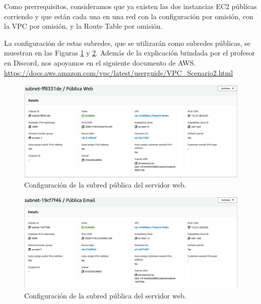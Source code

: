 \documentclass{article}
\begin{document}
Como prerrequisitos, consideramos que ya existen las
dos instancias EC2 p\'ublicas corriendo y que est\'an
cada una en una red con la configuraci\'on por omisi\'on,
con la VPC por omisi\'on, y la Route Table por omisi\'on.

La configuraci\'on de estas subredes, que se
utilizar\'an como subredes p\'ublicas, se muestran en las
Figuras \ref{fig:NAT-webSubnet} y \ref{fig:NAT-emailSubnet}.
Adem\'as de la explicaci\'on brindada por el profesor en
Discord, nos apoyamos en el siguiente documento de AWS.
\href{https://docs.aws.amazon.com/vpc/latest/userguide/VPC_Scenario2.html}{https://docs.aws.amazon.com/vpc/latest/userguide/VPC\_Scenario2.html}

\begin{figure}[H]
  \centering
  \includegraphics[width=\textwidth]{NAT/webSubnet}
  \caption{Configuraci\'on de la subred p\'ublica del
           servidor web.}
  \label{fig:NAT-webSubnet}
\end{figure}

\begin{figure}[H]
  \centering
  \includegraphics[width=\textwidth]{NAT/emailSubnet}
  \caption{Configuraci\'on de la subred p\'ublica del
           servidor web.}
  \label{fig:NAT-emailSubnet}
\end{figure}
\end{document}
